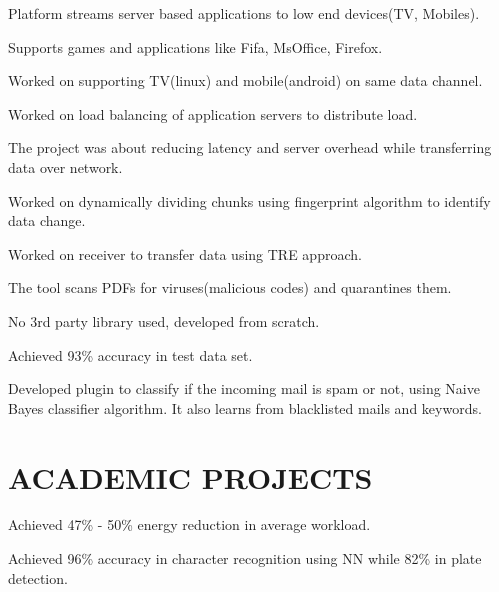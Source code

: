 \documentclass[]{deedy-resume-openfont}
\begin{document}
\begin{minipage}[t]{0.65\textwidth}
\location{}
\begin{tightemize}
\item Platform streams server based applications to low end devices(TV, Mobiles).
\item Supports games and applications like Fifa, MsOffice, Firefox.
\item Worked on supporting TV(linux) and mobile(android) on same data channel.
\item Worked on load balancing of application servers to distribute load.
\end{tightemize}
\sectionsep

\location{}
\begin{tightemize}
\item The project was about reducing latency and server overhead while transferring data over network.
\item Worked on dynamically dividing chunks using fingerprint algorithm to identify data change.
\item Worked on receiver to transfer data using TRE approach.
\end{tightemize}
\sectionsep

\location{}
\begin{tightemize}
\item The tool scans PDFs for viruses(malicious codes) and quarantines them.
\item No 3rd party library used, developed from scratch.
\item Achieved 93\% accuracy in test data set.
\end{tightemize}
\sectionsep

\location{}
\begin{tightemize}
\item Developed plugin to classify if the incoming mail is spam or not, using Naive Bayes classifier algorithm.  It also learns from blacklisted mails and keywords.
\end{tightemize}
\sectionsep

\section{ACADEMIC PROJECTS}
\location{}
\begin{tightemize}
\item Achieved 47\% - 50\% energy reduction in average workload.  
\end{tightemize}
\sectionsep

\begin{tightemize}
\item Achieved 96\% accuracy in character recognition using NN while 82\% in plate detection.
\end{tightemize}
\sectionsep


\end{minipage} 
\end{document}
